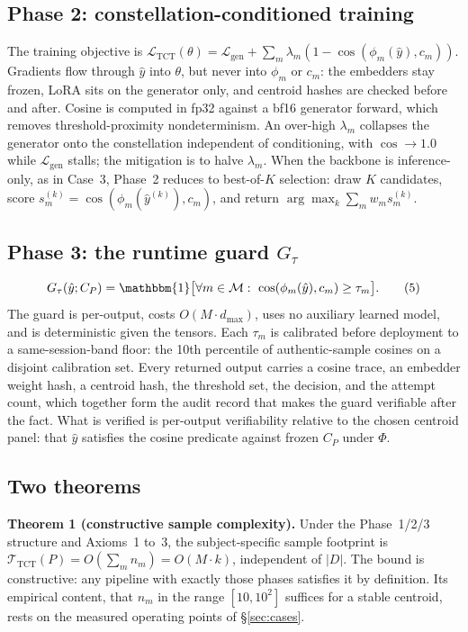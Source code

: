 \documentclass[10pt,twocolumn]{article}
\newcommand{\ind}{\mathbbm{1}}
\begin{document}
\subsection{Phase 2: constellation-conditioned training}
The training objective is
$\mathcal{L}_{\mathrm{TCT}}(\theta) = \mathcal{L}_{\mathrm{gen}} +
\sum_m\lambda_m(1-\cos(\phi_m(\hat y),c_m))$. Gradients flow through $\hat y$ into
$\theta$, but never into $\phi_m$ or $c_m$: the embedders stay frozen, LoRA sits on
the generator only, and centroid hashes are checked before and after. Cosine is
computed in fp32 against a bf16 generator forward, which removes
threshold-proximity nondeterminism. An over-high $\lambda_m$ collapses the
generator onto the constellation independent of conditioning, with $\cos\to1.0$
while $\mathcal{L}_{\mathrm{gen}}$ stalls; the mitigation is to halve $\lambda_m$.
When the backbone is inference-only, as in Case~3, Phase~2 reduces to best-of-$K$
selection: draw $K$ candidates, score $s_m^{(k)}=\cos(\phi_m(\hat y^{(k)}),c_m)$,
and return $\arg\max_k\sum_m w_m s_m^{(k)}$.

\subsection{Phase 3: the runtime guard $G_\tau$}
\begin{equation}
G_\tau(\hat y;C_P) = \ind\bigl[\forall m\in\mathcal{M}:\
\cos(\phi_m(\hat y),c_m)\ge\tau_m\bigr].\tag{5}
\end{equation}
The guard is per-output, costs $O(M\cdot d_{\max})$, uses no auxiliary learned
model, and is deterministic given the tensors. Each $\tau_m$ is calibrated before
deployment to a same-session-band floor: the 10th percentile of authentic-sample
cosines on a disjoint calibration set. Every returned output carries a cosine
trace, an embedder weight hash, a centroid hash, the threshold set, the decision,
and the attempt count, which together form the audit record that makes the guard
verifiable after the fact. What is verified is per-output verifiability relative
to the chosen centroid panel: that $\hat y$ satisfies the cosine predicate against
frozen $C_P$ under $\Phi$.

\subsection{Two theorems}
\textbf{Theorem 1 (constructive sample complexity).} Under the Phase~1/2/3
structure and Axioms~1 to~3, the subject-specific sample footprint is
$\mathcal{T}_{\mathrm{TCT}}(P)=O(\sum_m n_m)=O(M\cdot k)$, independent of $|D|$.
The bound is constructive: any pipeline with exactly those phases satisfies it by
definition. Its empirical content, that $n_m$ in the range $[10,10^2]$ suffices
for a stable centroid, rests on the measured operating points of
\S\ref{sec:cases}.
\end{document}
